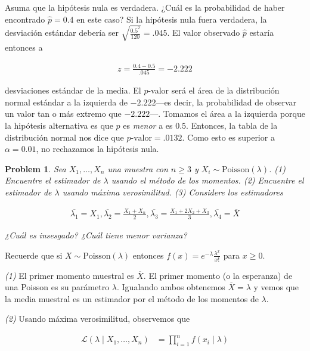 \documentclass[a4paper, 12pt]{article}
\newtheorem{problem}{Problem}
\newtheorem{problem}{Problem}
\begin{document}
Asuma que la hipótesis nula es verdadera. ¿Cuál es la probabilidad de haber
encontrado $\hat{p} = 0.4$ en este caso? Si la hipótesis nula fuera
verdadera, la desviación estándar debería ser $\sqrt{\frac{0.5^2}{120}} = .045
$. El valor observado $\hat{p}$ estaría entonces a

\begin{align*}
    z = \frac{0.4 - 0.5}{.045} = -2.222
\end{align*}

desviaciones estándar de la media. El $p$-valor será el área de la distribución
normal estándar a la izquierda de $-2.222$---es decir, la probabilidad de
observar un valor tan o más extremo que $-2.222$---. Tomamos el área a la
izquierda porque la hipótesis alternativa es que $p$ es \textit{menor} a es
$0.5$. Entonces, la tabla de la distribución normal nos dice que $p\text{-valor}
= .0132$. Como esto es superior a $\alpha = 0.01$, no rechazamos la hipótesis
nula.

\pagebreak 

\begin{problem}
    Sea $X_1, \ldots, X_n$ una muestra con $n \geq 3$ y $X_i \sim
    \text{Poisson}(\lambda)$. \textit{(1)} Encuentre el estimador de $\lambda$
    usando el método de los momentos. \textit{(2)} Encuentre el estimador de
    $\lambda$ usando máxima verosimilitud. \textit{(3)} Considere los
    estimadores 

    \begin{align*}
        \overline{\lambda_1} = X_1, \overline{\lambda_2} = \frac{X_1 + X_n}{2},
        \overline{\lambda_3} = \frac{X_1 + 2X_2 + X_3}{3}, \overline{\lambda_4}
        = \overline{X}
    \end{align*}

    ¿Cuál es insesgado? ¿Cuál tiene menor varianza?
\end{problem}

Recuerde que si $X \sim \text{Poisson}(\lambda)$ entonces $f(x) = e^{-\lambda}
\frac{\lambda^x}{x!}$ para $x \geq 0$.

\textit{(1)} El primer momento muestral es $\overline{X}$. El primer momento (o
la esperanza) de una Poisson es su parámetro $\lambda$. Igualando ambos
obtenemos $\overline{X} = \lambda$ y vemos que la media muestral es un estimador
por el método de los momentos de $\lambda$. 

\textit{(2)} Usando máxima verosimilitud, observemos que 

\begin{align*}
    \mathcal{L}(\lambda \mid X_1, \ldots, X_n) &= \prod_{i=1}^{n} f(x_i \mid
    \lambda)   \\ 
\end{align*}
\end{document}
